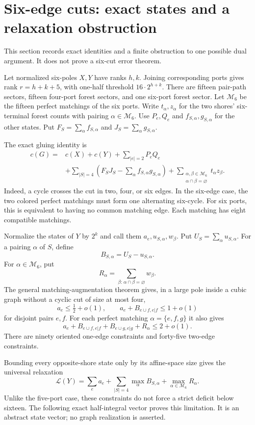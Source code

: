 \section{Six-edge cuts: exact states and a relaxation obstruction}
\label{sec:six-cut-partial}

This section records exact identities and a finite obstruction to one possible dual argument.
It does not prove a six-cut error theorem.

Let normalized six-poles $X,Y$ have ranks $h,k$.
Joining corresponding ports gives rank $r=h+k+5$, with one-half threshold $16\cdot2^{h+k}$.
There are fifteen pair-path sectors, fifteen four-port forest sectors, and one six-port forest sector.
Let $\mathcal M_6$ be the fifteen perfect matchings of the six ports.
Write $t_\alpha,z_\alpha$ for the two shores' six-terminal forest counts with pairing $\alpha\in\mathcal M_6$.
Use $P_e,Q_e$ and $f_{S,\alpha},g_{S,\alpha}$ for the other states.
Put $F_S=\sum_\alpha f_{S,\alpha}$ and $J_S=\sum_\alpha g_{S,\alpha}$.

The exact gluing identity is
\[
\begin{split}
 c(G)={}&c(X)+c(Y)+\sum_{|e|=2}P_eQ_e\\
 &+\sum_{|S|=4}\left(F_SJ_S-\sum_\alpha f_{S,\alpha}g_{S,\alpha}\right)
 +\sum_{\substack{\alpha,\beta\in\mathcal M_6\\\alpha\cap\beta=\varnothing}}t_\alpha z_\beta.
\end{split}
\]
Indeed, a cycle crosses the cut in two, four, or six edges.
In the six-edge case, the two colored perfect matchings must form one alternating six-cycle.
For six ports, this is equivalent to having no common matching edge.
Each matching has eight compatible matchings.

Normalize the states of $Y$ by $2^k$ and call them $a_e,u_{S,\alpha},w_\beta$.
Put $U_S=\sum_\alpha u_{S,\alpha}$.
For a pairing $\alpha$ of $S$, define
\[
 B_{S,\alpha}=U_S-u_{S,\alpha}.
\]
For $\alpha\in\mathcal M_6$, put
\[
 R_\alpha=\sum_{\beta:\,\alpha\cap\beta=\varnothing}w_\beta.
\]
The general matching-augmentation theorem gives, in a large pole inside a cubic graph without a cyclic cut of size at most four,
\[
 a_e\le\tfrac12+o(1),\qquad
 a_e+B_{e\cup f,e|f}\le1+o(1)
\]
for disjoint pairs $e,f$.
For each perfect matching $\alpha=\{e,f,g\}$ it also gives
\[
 a_e+B_{e\cup f,e|f}+B_{e\cup g,e|g}+R_\alpha\le2+o(1).
\]
There are ninety oriented one-edge constraints and forty-five two-edge constraints.

Bounding every opposite-shore state only by its affine-space size gives the universal relaxation
\[
 \mathcal L(Y)=\sum_ea_e+\sum_{|S|=4}\max_\alpha B_{S,\alpha}
                         +\max_{\alpha\in\mathcal M_6}R_\alpha.
\]
Unlike the five-port case, these constraints do not force a strict deficit below sixteen.
The following exact half-integral vector proves this limitation.
It is an abstract state vector; no graph realization is asserted.

